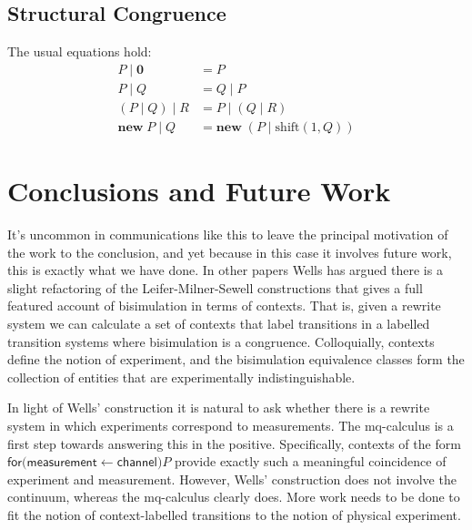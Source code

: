 \documentclass[11pt]{article}
\begin{document}
\subsection{Structural Congruence}

The usual equations hold:
\begin{align*}
  P \mid \mathbf{0} &= P \\
  P \mid Q &= Q \mid P \\
  (P \mid Q) \mid R &= P \mid (Q \mid R) \\
  \mathbf{new}\; P \mid Q &= \mathbf{new}\;(P \mid \mathrm{shift}(1, Q))
\end{align*}

\section{Conclusions and Future Work}

It's uncommon in communications like this to leave the principal
motivation of the work to the conclusion, and yet because in this case
it involves future work, this is exactly what we have done. In other
papers Wells has argued there is a slight refactoring of the
Leifer-Milner-Sewell constructions that gives a full featured account
of bisimulation in terms of contexts. That is, given a rewrite system
we can calculate a set of contexts that label transitions in a
labelled transition systems where bisimulation is a
congruence. Colloquially, contexts define the notion of experiment,
and the bisimulation equivalence classes form the collection of
entities that are experimentally indistinguishable.

In light of Wells' construction it is natural to ask whether there is
a rewrite system in which experiments correspond to measurements. The
mq-calculus is a first step towards answering this in the
positive. Specifically, contexts of the form $\mathsf{for(measurement
  \leftarrow channel}\mathsf{)}P$ provide exactly such a meaningful
coincidence of experiment and measurement. However, Wells'
construction does not involve the continuum, whereas the mq-calculus
clearly does. More work needs to be done to fit the notion of
context-labelled transitions to the notion of physical experiment.

   

\end{document}
